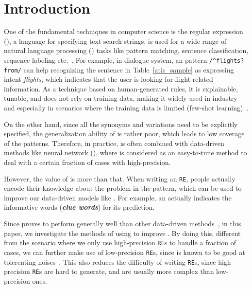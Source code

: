 \section{Introduction}


One of the fundamental techniques in computer science is the regular expression (\RE), a language for specifying text search strings.  \RE
is used for a wide range of natural language processing (\NLP) tasks like pattern matching, sentence classification, sequence labeling
etc.~\cite{chang2014tokensregex}. For example, in dialogue system, an \RE pattern \texttt{/\textasciicircum flights? from/} can help
recognizing the sentence in Table~\ref{atis_sample} as expressing intent \emph{flights}, which indicates that the user is looking for
flight-related information. As a technique based on human-generated rules, it is explainable, tunable, and does not rely on training data,
making it widely used in industry and especially in scenarios where the training data is limited (few-shot learning)~\cite{gc2015big}.

On the other hand, since all the synonyms and variations need to be explicitly specified, the generalization ability of \RE is rather poor,
which leads to low coverage of the patterns. Therefore, in practice, \RE is often combined with data-driven methods like neural network
(\NN), where \RE is considered as an easy-to-tune method to deal with a certain fraction of cases with high-precision.

However, the value of \RE is more than that. When writing an \texttt{RE}, people actually encode their knowledge about the problem in the
pattern, which can be used to improve our data-driven models like \NN. For example, an \RE actually indicates the informative words
(\textbf{\emph{clue words}}) for its prediction.

Since \NN proves to perform generally well than other data-driven methods~\cite{kim2014convolutional, bahdanau2014neural}, in this paper,
we investigate the methods of using \RE to improve \NN. By doing this, different from the scenario where we only use high-precision
\texttt{RE}s to handle a fraction of cases, we can further make use of low-precision \texttt{RE}s, since \NN is known to be good at
tolerenting noises~\cite{xie2016disturblabel}. This also reduces the difficulty of writing \texttt{RE}s, since high-precision \texttt{RE}s
are hard to generate, and are usually more complex than low-precision ones.



